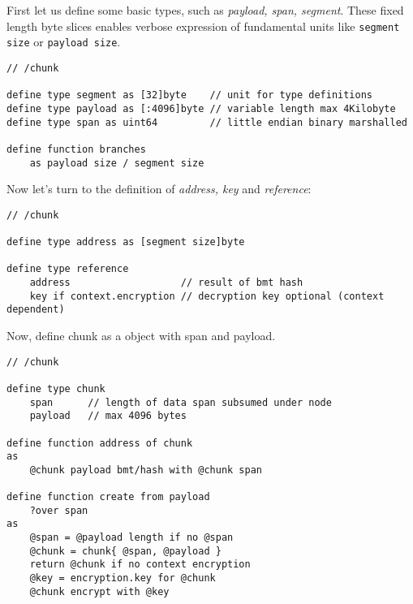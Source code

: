 First let us define some basic types, such as \emph{payload, span, segment}. These fixed length byte slices enables verbose expression of fundamental units like \lstinline{segment size} or \lstinline{payload size}.

\begin{definition}\label{def:chunk-constants}
\begin{lstlisting}[language=buzz1]
// /chunk

define type segment as [32]byte    // unit for type definitions
define type payload as [:4096]byte // variable length max 4Kilobyte
define type span as uint64         // little endian binary marshalled

define function branches 
    as payload size / segment size

\end{lstlisting}
\end{definition}

Now  let's turn to the definition of \emph{address,  key} and \emph{reference}:                                             

\begin{definition}\label{def:chunk-reference}
\begin{lstlisting}[language=buzz1]
// /chunk

define type address as [segment size]byte

define type reference 
    address                   // result of bmt hash
    key if context.encryption // decryption key optional (context dependent)

\end{lstlisting}
\end{definition}

Now, define chunk as a object with span  and payload.

\begin{definition}\label{def:chunks}
\begin{lstlisting}[language=buzz1]
// /chunk

define type chunk
    span      // length of data span subsumed under node
    payload   // max 4096 bytes 

define function address of chunk
as
    @chunk payload bmt/hash with @chunk span 

define function create from payload
    ?over span
as
    @span = @payload length if no @span
    @chunk = chunk{ @span, @payload }
    return @chunk if no context encryption
    @key = encryption.key for @chunk 
    @chunk encrypt with @key
\end{lstlisting}
\end{definition}

